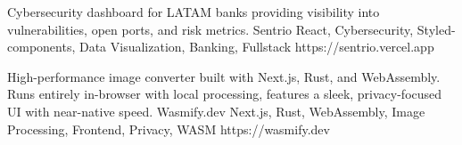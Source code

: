 \documentclass[]{awesome-cv}
\begin{document}
\vspace{-5mm}

\begin{cventries}
	\cventry
	{Cybersecurity dashboard for LATAM banks providing visibility into vulnerabilities, open ports, and risk metrics.}
	{Sentrio}
	{React, Cybersecurity, Styled-components, Data Visualization, Banking, Fullstack}
	{https://sentrio.vercel.app}
	{}
	
	\vspace{-3mm}
	
	\cventry
	{High-performance image converter built with Next.js, Rust, and WebAssembly. Runs entirely in-browser with local processing, features a sleek, privacy-focused UI with near-native speed.}
	{Wasmify.dev}
	{Next.js, Rust, WebAssembly, Image Processing, Frontend, Privacy, WASM}
	{https://wasmify.dev}
	{}
\end{cventries}

\vspace{-2mm}
\end{document}
